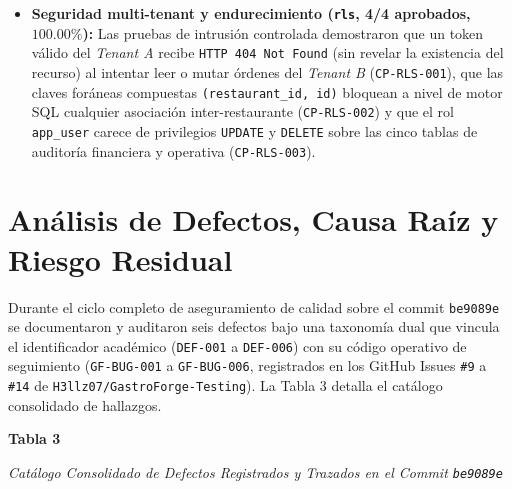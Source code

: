 \documentclass[stu,12pt,a4paper]{apa7}
\begin{document}
\begin{itemize}
\item
  \textbf{Seguridad multi-tenant y endurecimiento (\texttt{rls}, 4/4 aprobados, \(100.00\%\)):} Las pruebas de intrusión controlada demostraron que un token válido del \emph{Tenant A} recibe \texttt{HTTP 404 Not Found\allowbreak{}} (sin revelar la existencia del recurso) al intentar leer o mutar órdenes del \emph{Tenant B} (\texttt{CP-{}\allowbreak{}RLS-{}\allowbreak{}001}), que las claves foráneas compuestas \texttt{(\allowbreak{}restaurant\_\allowbreak{}id,\allowbreak{} id)\allowbreak{}} bloquean a nivel de motor SQL cualquier asociación inter-restaurante (\texttt{CP-{}\allowbreak{}RLS-{}\allowbreak{}002}) y que el rol \texttt{app\_\allowbreak{}user} carece de privilegios \texttt{UPDATE} y \texttt{DELETE} sobre las cinco tablas de auditoría financiera y operativa (\texttt{CP-{}\allowbreak{}RLS-{}\allowbreak{}003}).
\end{itemize}

\section{Análisis de Defectos, Causa Raíz y Riesgo Residual}\label{anuxe1lisis-de-defectos-causa-rauxedz-y-riesgo-residual}

Durante el ciclo completo de aseguramiento de calidad sobre el commit \texttt{be9089e} se documentaron y auditaron seis defectos bajo una taxonomía dual que vincula el identificador académico (\texttt{DEF-{}\allowbreak{}001} a \texttt{DEF-{}\allowbreak{}006}) con su código operativo de seguimiento (\texttt{GF-{}\allowbreak{}BUG-{}\allowbreak{}001} a \texttt{GF-{}\allowbreak{}BUG-{}\allowbreak{}006}, registrados en los GitHub Issues \texttt{\#9} a \texttt{\#14} de \texttt{H3llz07/\allowbreak{}GastroForge-{}\allowbreak{}Testing}). La Tabla 3 detalla el catálogo consolidado de hallazgos.

\noindent\textbf{Tabla 3}\par\nopagebreak\noindent\textit{Catálogo Consolidado de Defectos Registrados y Trazados en el Commit \texttt{be9089e}}\par\nopagebreak\vspace{0.3em}

\begingroup\singlespacing\scriptsize\setlength{\parskip}{0pt}
\end{document}
